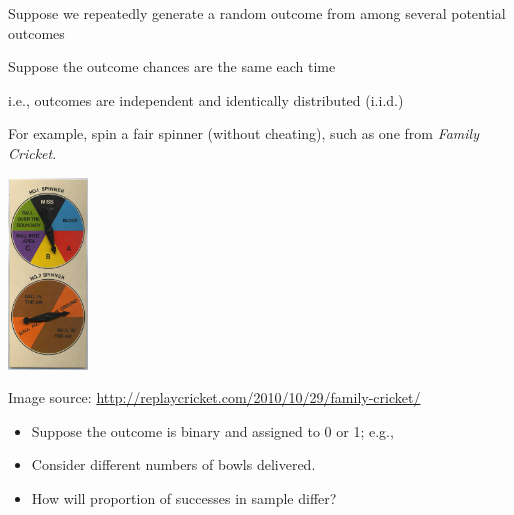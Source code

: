 \documentclass[10pt]{report}
\begin{document}


%
\noindent
\begin{minipage}[t]{0.69\textwidth}
\vspace*{-1.9in}
\begin{subitemize}
\item Suppose we repeatedly generate a random outcome from among
several potential outcomes
\item Suppose the outcome chances are the same each time
\begin{subsubitemize}
\item i.e., outcomes are independent and identically distributed (i.i.d.)
\end{subsubitemize}
\item For example, spin a fair spinner (without cheating), such as one from \emph{Family Cricket}.
\end{subitemize}
\end{minipage}
%
\begin{minipage}[t]{0.29\textwidth}
\hfill \includegraphics[height=2in]{img/family-cricket-spinner.jpg}
\end{minipage}
\vfill
\hfill {\tiny Image source: \url{http://replaycricket.com/2010/10/29/family-cricket/}}


%
\begin{itemize}
\item Suppose the outcome is binary and assigned to 0 or 1; e.g.,
\item Consider different numbers of bowls delivered.
\item How will proportion of successes in sample differ?
\end{itemize}
\end{document}
